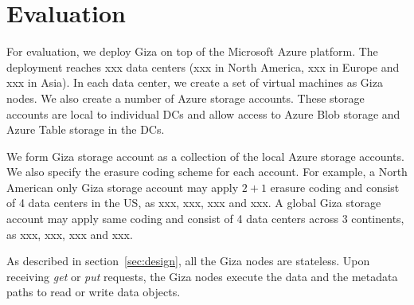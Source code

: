 \section{Evaluation}


For evaluation, we deploy Giza on top of the Microsoft Azure platform. The deployment reaches xxx data centers (xxx in North America, xxx in Europe and xxx in Asia). In each data center, we create a set of virtual machines as Giza nodes. We also create a number of Azure storage accounts. These storage accounts are local to individual DCs and allow access to Azure Blob storage and Azure Table storage in the DCs.

We form Giza storage account as a collection of the local Azure storage accounts. We also specify the erasure coding scheme for each account. For example, a North American only Giza storage account may apply $2+1$ erasure coding and consist of 4 data centers in the US, as xxx, xxx, xxx and xxx. A global Giza storage account may apply same coding and consist of 4 data centers across 3 continents, as xxx, xxx, xxx and xxx.

As described in section~\ref{sec:design}, all the Giza nodes are stateless. Upon receiving {\em get} or {\em put} requests, the Giza nodes execute the data and the metadata paths to read or write data objects.

